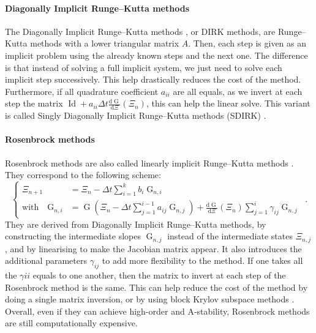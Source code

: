         \paragraph{Diagonally Implicit Runge--Kutta methods}
        The Diagonally Implicit Runge--Kutta methods \cite{Alexander1977}, or DIRK methods, are Runge--Kutta methods with a lower triangular matrix $A$.
        Then, each step is given as an implicit problem using the already known steps and the next one.
        The difference is that instead of solving a full implicit system, we just need to solve each implicit step successively.
        This help drastically reduces the cost of the method.
        Furthermore, if all quadrature coefficient $a_{ii}$ are all equals, as we invert at each step the matrix $\operatorname{Id} + a_{ii} \Delta t \frac{\mathrm{d} \operatorname{G}}{\mathrm{d} \Xi}\left(\Xi_n\right)$, this can help the linear solve.
        This variant is called Singly Diagonally Implicit Runge--Kutta methods (SDIRK) \cite{HairerWanner1996}.

        \paragraph{Rosenbrock methods}
        Rosenbrock methods are also called linearly implicit Runge--Kutta methods \cite{Rosenbrock1963}.
        They correspond to the following scheme:
        \begin{equation}
          \left\{\begin{aligned}
            \Xi_{n+1} &= \Xi_n - \Delta t \sum_{i = 1}^k b_i \operatorname{G}_{n,i} \\
            \textrm{with}\quad \operatorname{G}_{n,i} &= \operatorname{G}\left(\Xi_n - \Delta t \sum_{j = 1}^{i-1} a_{ij} \operatorname{G}_{n,j}\right) + \frac{\mathrm{d} \operatorname{G}}{\mathrm{d} \Xi}\left(\Xi_n\right) \sum_{j = 1}^{i} \gamma_{ij} \operatorname{G}_{n,j}
          \end{aligned}\right. \ .
        \end{equation}
        They are derived from Diagonally Implicit Runge--Kutta methods, by constructing the intermediate slopes $\operatorname{G}_{n,j}$ instead of the intermediate states $\Xi_{n,j}$, and by linearising to make the Jacobian matrix appear.
        It also introduces the additional parameters $\gamma_{ij}$ to add more flexibility to the method.
        If one takes all the $\gamma{ii}$ equals to one another, then the matrix to invert at each step of the Rosenbrock method is the same.
        This can help reduce the cost of the method by doing a single matrix inversion, or by using block Krylov subspace methods \cite{Gutknecht2006}.
        Overall, even if they can achieve high-order and A-stability, Rosenbrock methods are still computationally expensive.


